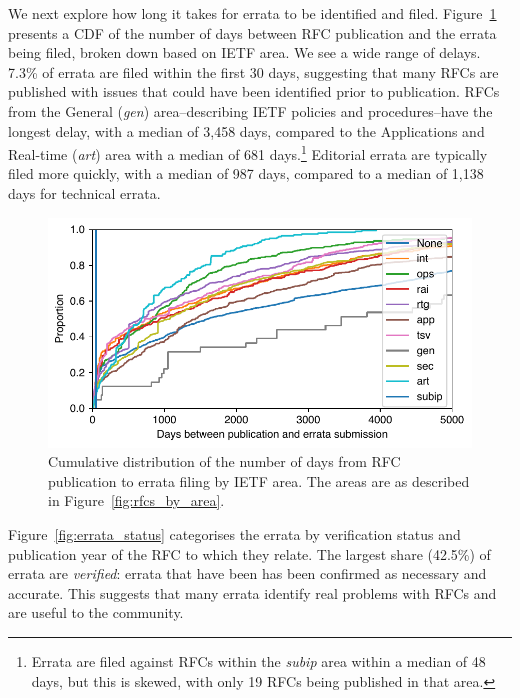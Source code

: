 \documentclass[twocolumn,10pt]{article}
\newlength{\figureWidthOneColumn}
\newcommand{\pb}[1]{\vspace{0.75ex}\noindent{\textbf{#1}}}
\begin{document}



\pb{Errata Delay:}
We next explore how long it takes for errata to be identified and filed.
Figure~\ref{fig:errata_submission_days} presents a CDF of the number of
days between RFC publication and the errata being filed, broken down based
on IETF area. We see a wide range of delays. 7.3\% of errata are filed
within the first 30 days, suggesting that many RFCs are published with
issues that could have been identified prior to publication.  RFCs from the
General (\emph{gen}) area--describing IETF policies and procedures--have
the longest delay, with a median of 3,458 days, compared to the
Applications and Real-time (\emph{art}) area with a median of 681
days.\footnote{Errata are filed against RFCs within the \emph{subip} area
within a median of 48 days, but this is skewed, with only 19 RFCs being
published in that area.} Editorial errata are typically filed more quickly,
with a median of 987 days, compared to a median of 1,138 days for technical
errata. 


\begin{figure}
  \centering
  \includegraphics[width=\figureWidthOneColumn]{figures-prev/tma-2023/errata-submission-dates-area.pdf}
  \caption{
    Cumulative distribution of the number of days from RFC publication to
    errata filing by IETF area.
    The areas are as described in Figure~\ref{fig:rfcs_by_area}.
  }
  \label{fig:errata_submission_days}
\end{figure}


\pb{Errata Status:}
Figure~\ref{fig:errata_status} categorises the errata by verification
status and publication year of the RFC to which they relate. 
The largest share (42.5\%) of errata are \emph{verified}: errata that have
been has been confirmed as necessary and accurate. This suggests that many
errata identify real problems with RFCs and are useful to the community.
\end{document}
